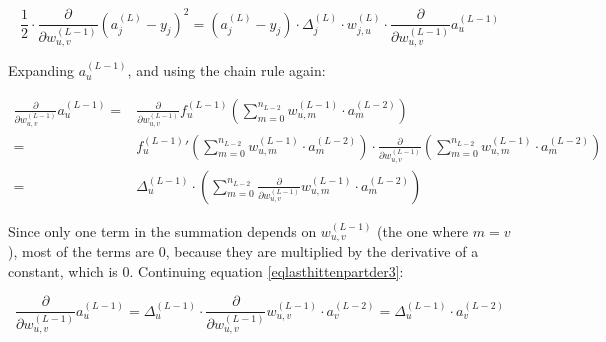 \documentclass[titlepage]{article}
\begin{document}
          \begin{equation}\label{eqlasthittenpartder2}
            \frac{1}{2}
            \cdot
            \frac{\partial}{\partial w_{u,v}^{(L-1)}}
              \left( a_j^{(L)} - y_j \right)^2
                = \left( a_j^{(L)} - y_j \right)
                  \cdot
                  \Delta_j^{(L)}
                  \cdot
                  w_{j,u}^{(L)}
                  \cdot
                  \frac{\partial}{\partial w_{u,v}^{(L-1)}}
                    a_{u}^{(L-1)}
          \end{equation}

          Expanding $a_{u}^{(L-1)}$, and using the chain rule again:

          \begin{equation}\label{eqlasthittenpartder3}
            \begin{split}
              \frac{\partial}{\partial w_{u,v}^{(L-1)}}
                a_{u}^{(L-1)}
                  = & \frac{\partial}{\partial w_{u,v}^{(L-1)}}
                      f_{u}^{(L-1)} \left(
                        \sum_{m=0}^{n_{L-2}}
                          w_{u,m}^{(L-1)} \cdot a_m^{(L-2)}
                      \right) \\
                  = & {f_{u}^{(L-1)}}' \left(
                        \sum_{m=0}^{n_{L-2}}
                          w_{u,m}^{(L-1)} \cdot a_m^{(L-2)}
                      \right)
                      \cdot
                      \frac{\partial}{\partial w_{u,v}^{(L-1)}}
                        \left(
                          \sum_{m=0}^{n_{L-2}}
                            w_{u,m}^{(L-1)} \cdot a_m^{(L-2)}
                        \right) \\
                  = & \Delta_u^{(L-1)}
                      \cdot
                      \left(
                        \sum_{m=0}^{n_{L-2}}
                          \frac{\partial}{\partial w_{u,v}^{(L-1)}}
                            w_{u,m}^{(L-1)} \cdot a_m^{(L-2)}
                      \right)
            \end{split}
          \end{equation}

          Since only one term in the summation depends on $w_{u,v}^{(L-1)}$
          (the one where $m = v$), most of the terms are $0$, because they are
          multiplied by the derivative of a constant, which is $0$. Continuing
          equation \ref{eqlasthittenpartder3}:

          \begin{equation}
            \frac{\partial}{\partial w_{u,v}^{(L-1)}}
              a_{u}^{(L-1)}
                = \Delta_u^{(L-1)}
                  \cdot
                  \frac{\partial}{\partial w_{u,v}^{(L-1)}}
                    w_{u,v}^{(L-1)} \cdot a_{v}^{(L-2)}
                = \Delta_u^{(L-1)} \cdot a_{v}^{(L-2)}
          \end{equation}
\end{document}
